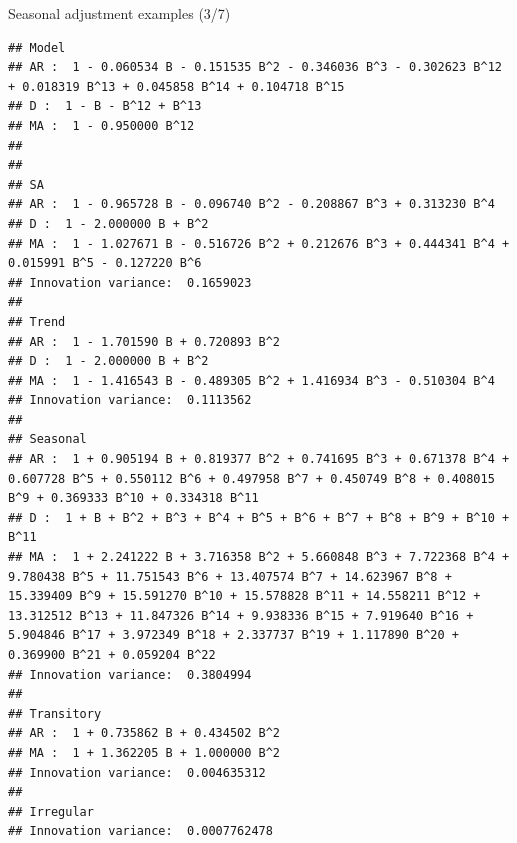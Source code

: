 \documentclass[10pt,xcolor=table,color={dvipsnames,usenames},ignorenonframetext,usepdftitle=false,french]{beamer}
\newenvironment{Shaded}{\begin{snugshade}}{\end{snugshade}}
\newcommand{\KeywordTok}[1]{\textcolor[rgb]{0.13,0.29,0.53}{\textbf{#1}}}
\newcommand{\DataTypeTok}[1]{\textcolor[rgb]{0.13,0.29,0.53}{#1}}
\newcommand{\OtherTok}[1]{\textcolor[rgb]{0.56,0.35,0.01}{#1}}
\newcommand{\OperatorTok}[1]{\textcolor[rgb]{0.81,0.36,0.00}{\textbf{#1}}}
\newcommand{\NormalTok}[1]{#1}
\begin{document}
\begin{frame}[fragile]{Seasonal adjustment examples (3/7)}

\footnotesize

\begin{Shaded}
\end{Shaded}

\begin{verbatim}
## Model
## AR :  1 - 0.060534 B - 0.151535 B^2 - 0.346036 B^3 - 0.302623 B^12 + 0.018319 B^13 + 0.045858 B^14 + 0.104718 B^15 
## D :  1 - B - B^12 + B^13 
## MA :  1 - 0.950000 B^12 
## 
## 
## SA
## AR :  1 - 0.965728 B - 0.096740 B^2 - 0.208867 B^3 + 0.313230 B^4 
## D :  1 - 2.000000 B + B^2 
## MA :  1 - 1.027671 B - 0.516726 B^2 + 0.212676 B^3 + 0.444341 B^4 + 0.015991 B^5 - 0.127220 B^6 
## Innovation variance:  0.1659023 
## 
## Trend
## AR :  1 - 1.701590 B + 0.720893 B^2 
## D :  1 - 2.000000 B + B^2 
## MA :  1 - 1.416543 B - 0.489305 B^2 + 1.416934 B^3 - 0.510304 B^4 
## Innovation variance:  0.1113562 
## 
## Seasonal
## AR :  1 + 0.905194 B + 0.819377 B^2 + 0.741695 B^3 + 0.671378 B^4 + 0.607728 B^5 + 0.550112 B^6 + 0.497958 B^7 + 0.450749 B^8 + 0.408015 B^9 + 0.369333 B^10 + 0.334318 B^11 
## D :  1 + B + B^2 + B^3 + B^4 + B^5 + B^6 + B^7 + B^8 + B^9 + B^10 + B^11 
## MA :  1 + 2.241222 B + 3.716358 B^2 + 5.660848 B^3 + 7.722368 B^4 + 9.780438 B^5 + 11.751543 B^6 + 13.407574 B^7 + 14.623967 B^8 + 15.339409 B^9 + 15.591270 B^10 + 15.578828 B^11 + 14.558211 B^12 + 13.312512 B^13 + 11.847326 B^14 + 9.938336 B^15 + 7.919640 B^16 + 5.904846 B^17 + 3.972349 B^18 + 2.337737 B^19 + 1.117890 B^20 + 0.369900 B^21 + 0.059204 B^22 
## Innovation variance:  0.3804994 
## 
## Transitory
## AR :  1 + 0.735862 B + 0.434502 B^2 
## MA :  1 + 1.362205 B + 1.000000 B^2 
## Innovation variance:  0.004635312 
## 
## Irregular
## Innovation variance:  0.0007762478
\end{verbatim}

\end{frame}
\end{document}
